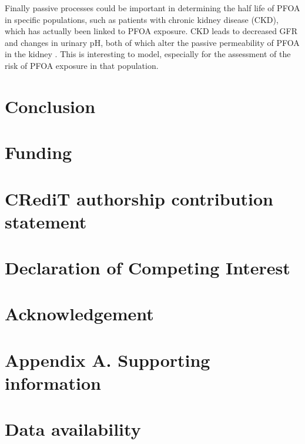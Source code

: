 \documentclass[
  authoryear,
  preprint]{elsarticle}
\begin{document}
Finally passive processes could be important in determining the half
life of PFOA in specific populations, such as patients with chronic
kidney disease (CKD), which has actually been linked to PFOA exposure.
CKD leads to decreased GFR and changes in urinary pH, both of which
alter the passive permeability of PFOA in the kidney \citep{huang2018} .
This is interesting to model, especially for the assessment of the risk
of PFOA exposure in that population.

\section{Conclusion}\label{conclusion}

\section{Funding}\label{funding}

\section{CRediT authorship contribution
statement}\label{credit-authorship-contribution-statement}

\section{Declaration of Competing
Interest}\label{declaration-of-competing-interest}

\section{Acknowledgement}\label{acknowledgement}

\section{Appendix A. Supporting
information}\label{appendix-a.-supporting-information}

\section{Data availability}\label{data-availability}


\renewcommand\refname{References}
  
\end{document}

